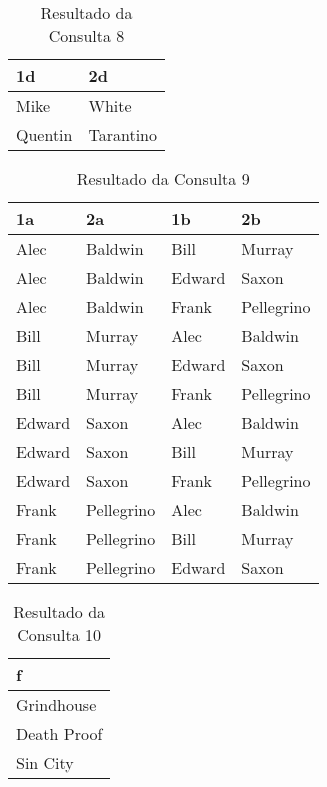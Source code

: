 \documentclass{article}
\begin{document}
\begin{table}[htbp]
\begin{center}
\begin{tabular}{ll}

\textbf{1d} & \textbf{2d} \\ 
\midrule
Mike & White \\ 
Quentin & Tarantino  \\ 
\end{tabular}
\end{center}
\caption{Resultado da Consulta 8}

\end{table}

\begin{table}[htbp]
\begin{center}
\begin{tabular}{llll}

\textbf{1a} & \textbf{2a} & \textbf{1b} & \textbf{2b} \\ 
\midrule
Alec & Baldwin & Bill & Murray \\ 
Alec & Baldwin & Edward & Saxon \\ 
Alec & Baldwin & Frank & Pellegrino \\ 
Bill & Murray & Alec & Baldwin \\ 
Bill & Murray & Edward & Saxon \\ 
Bill & Murray & Frank & Pellegrino \\ 
Edward & Saxon & Alec & Baldwin \\ 
Edward & Saxon & Bill & Murray \\ 
Edward & Saxon & Frank & Pellegrino \\ 
Frank & Pellegrino & Alec & Baldwin \\ 
Frank & Pellegrino & Bill & Murray \\ 
Frank & Pellegrino & Edward & Saxon \\ 
\end{tabular}
\end{center}
\caption{Resultado da Consulta 9}

\end{table}

\begin{table}[htbp]
\begin{center}
\begin{tabular}{l}

\textbf{f} \\ 
\midrule
Grindhouse \\ 
Death Proof \\ 
Sin City \\ 
\end{tabular}
\end{center}
\caption{Resultado da Consulta 10}

\end{table}

\end{document}
